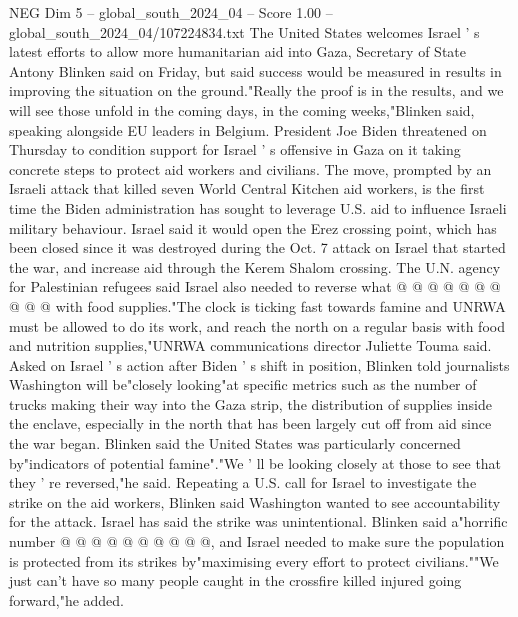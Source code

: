 \begin{textsample}{NEG Dim 5 – global\_south\_2024\_04 – Score 1.00 – global\_south\_2024\_04/107224834.txt}  \label{ex:f5_neg_188}
The United States welcomes Israel ' s latest efforts to allow more humanitarian aid into Gaza, Secretary of State Antony Blinken said on Friday, but said success would be measured in results in improving the situation on the ground."Really the proof is in the results, and we will see those unfold in the coming days, in the coming weeks,"Blinken said, speaking alongside EU leaders in Belgium.
President Joe Biden threatened on Thursday to condition support for Israel ' s offensive in Gaza on it taking concrete steps to protect aid workers and civilians.
The move, prompted by an Israeli attack that killed seven World Central Kitchen aid workers, is the first time the Biden administration has sought to leverage U.S. aid to influence Israeli military behaviour.
Israel said it would open the Erez crossing point, which has been closed since it was destroyed during the Oct. 7 attack on Israel that started the war, and increase aid through the Kerem Shalom crossing.
The U.N. agency for Palestinian refugees said Israel also needed to reverse what @ @ @ @ @ @ @ @ @ @ with food supplies."The clock is ticking fast towards famine and UNRWA must be allowed to do its work, and reach the north on a regular basis with food and nutrition supplies,"UNRWA communications director Juliette Touma said.
Asked on Israel ' s action after Biden ' s shift in position, Blinken told journalists Washington will be"closely looking"at specific metrics such as the number of trucks making their way into the Gaza strip, the distribution of supplies inside the enclave, especially in the north that has been largely cut off from aid since the war began.
Blinken said the United States was particularly concerned by"indicators of potential famine"."We ' ll be looking closely at those to see that they ' re reversed,"he said.
Repeating a U.S. call for Israel to investigate the strike on the aid workers, Blinken said Washington wanted to see accountability for the attack.
Israel has said the strike was unintentional.
Blinken said a"horrific number @ @ @ @ @ @ @ @ @ @, and Israel needed to make sure the population is protected from its strikes by"maximising every effort to protect civilians.""We just can't have so many people caught in the crossfire killed injured going forward,"he added.

\end{textsample}
